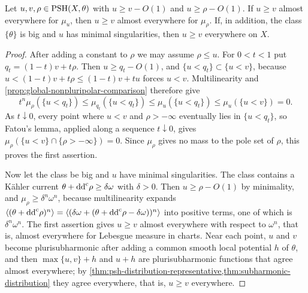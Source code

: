 \begin{corollary}\label{cor:nonpluripolar-domination-transfer}
Let $u,v,\rho\in\mathrm{PSH}(X,\theta)$ with $u\geq v-O(1)$ and $u\geq\rho-O(1)$. If $u\geq v$ almost everywhere for $\mu_u$, then $u\geq v$ almost everywhere for $\mu_\rho$. If, in addition, the class $\{\theta\}$ is big and $u$ has minimal singularities, then $u\geq v$ everywhere on $X$.
\end{corollary}
\begin{proof}
After adding a constant to $\rho$ we may assume $\rho\leq u$. For $0<t<1$ put $q_t=(1-t)v+t\rho$. Then $u\geq q_t-O(1)$, and $\{u<q_t\}\subset\{u<v\}$, because $u<(1-t)v+t\rho\leq(1-t)v+tu$ forces $u<v$. Multilinearity and \cref{prop:global-nonpluripolar-comparison} therefore give
\[
 t^n\mu_\rho(\{u<q_t\})
   \leq\mu_{q_t}(\{u<q_t\})
   \leq\mu_u(\{u<q_t\})\leq\mu_u(\{u<v\})=0.
\]
As $t\downarrow0$, every point where $u<v$ and $\rho>-\infty$ eventually lies in $\{u<q_t\}$, so Fatou's lemma, applied along a sequence $t\downarrow0$, gives $\mu_\rho(\{u<v\}\cap\{\rho>-\infty\})=0$. Since $\mu_\rho$ gives no mass to the pole set of $\rho$, this proves the first assertion.

Now let the class be big and $u$ have minimal singularities. The class contains a K\"ahler current $\theta+\mathrm{dd}^{\mathrm{c}}\rho\geq\delta\omega$ with $\delta>0$. Then $u\geq\rho-O(1)$ by minimality, and $\mu_\rho\geq\delta^n\omega^n$, because multilinearity expands $\langle(\theta+\mathrm{dd}^{\mathrm{c}}\rho)^n\rangle=\langle(\delta\omega+(\theta+\mathrm{dd}^{\mathrm{c}}\rho-\delta\omega))^n\rangle$ into positive terms, one of which is $\delta^n\omega^n$. The first assertion gives $u\geq v$ almost everywhere with respect to $\omega^n$, that is, almost everywhere for Lebesgue measure in charts. Near each point, $u$ and $v$ become plurisubharmonic after adding a common smooth local potential $h$ of $\theta$, and then $\max\{u,v\}+h$ and $u+h$ are plurisubharmonic functions that agree almost everywhere; by \cref{thm:psh-distribution-representative,thm:subharmonic-distribution} they agree everywhere, that is, $u\geq v$ everywhere.
\end{proof}
